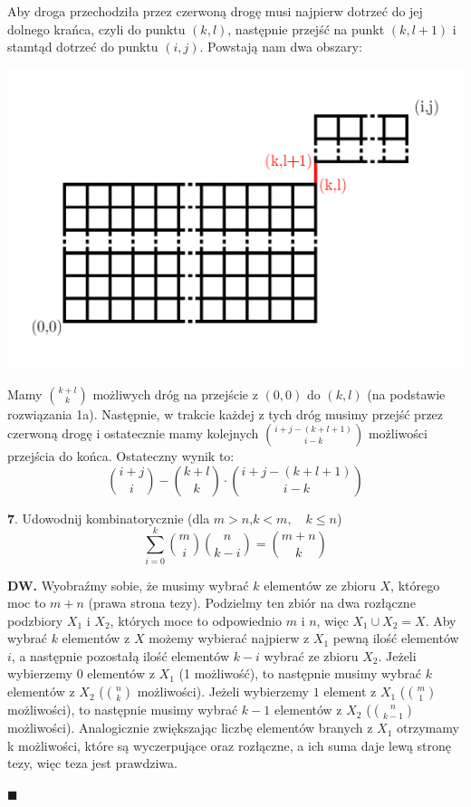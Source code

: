 \documentclass{article}
\begin{document}
Aby droga przechodziła przez czerwoną drogę musi najpierw dotrzeć do jej dolnego krańca, czyli do punktu $(k,l)$, następnie przejść na punkt $(k,l+1)$ i stamtąd dotrzeć do punktu $(i,j)$. Powstają nam dwa obszary:
\begin{center}
\includegraphics[scale=0.17]{path 3.jpg}
\end{center}

Mamy $k+l\choose k$ możliwych dróg na przejście z $(0,0)$ do $(k,l)$ (na podstawie rozwiązania 1a). Następnie, w trakcie każdej z tych dróg musimy przejść przez czerwoną drogę i ostatecznie mamy kolejnych $i+j-(k+l+1)\choose i-k$ możliwości przejścia do końca. Ostateczny wynik to:
$${{i+j}\choose{i} }-{k+l\choose k}\cdot{i+j-(k+l+1)\choose i-k}$$

\begin{flushleft}
\large \textbf{7}. Udowodnij kombinatorycznie (dla $m>n$,\quad $k<m,\quad k\leq n$) $$\sum_{i=0}^k {m\choose i}{n\choose k-i}={m+n\choose k}$$
\end{flushleft}
\textbf{DW.}
Wyobraźmy sobie, że musimy wybrać $k$ elementów ze zbioru $X$, którego moc to $m+n$ (prawa strona tezy). Podzielmy ten zbiór na dwa rozłączne podzbiory $X_1$ i $X_2$, których moce to odpowiednio $m$ i $n$, więc $X_1\cup X_2=X$. Aby wybrać $k$ elementów z $X$ możemy wybierać najpierw z $X_1$ pewną ilość elementów $i$, a następnie pozostałą ilość elementów $k-i$ wybrać ze zbioru $X_2$. Jeżeli wybierzemy $0$ elementów z $X_1$ (1 możliwość), to następnie musimy wybrać $k$ elementów z $X_2$ ($n\choose k$ możliwości). Jeżeli wybierzemy $1$ element z $X_1$ ($m\choose 1$ możliwości), to następnie musimy wybrać $k-1$ elementów z $X_2$ ($n\choose k-1$ możliwości). Analogicznie zwiększając liczbę elementów branych z $X_1$ otrzymamy k możliwości, które są wyczerpujące oraz rozłączne, a ich suma daje lewą stronę tezy, więc teza jest prawdziwa.
\begin{flushright}
$\blacksquare$
\end{flushright}
\end{document}
